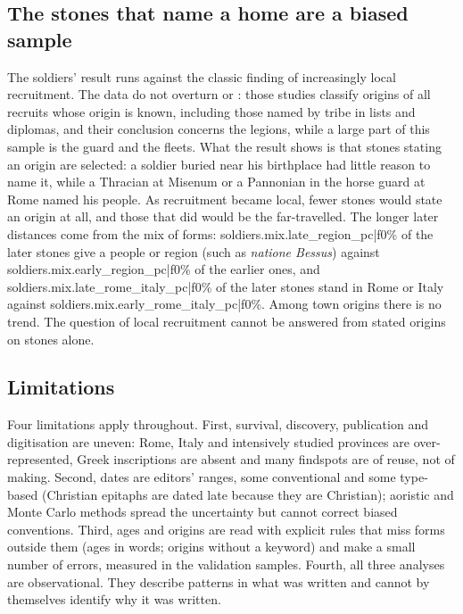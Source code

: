 \subsection{The stones that name a home are a biased sample}
The soldiers' result runs against the classic finding of increasingly local recruitment. The data do not overturn \citet{forni1953} or \citet{mann1983}: those studies classify origins of all recruits whose origin is known, including those named by tribe in lists and diplomas, and their conclusion concerns the legions, while a large part of this sample is the guard and the fleets. What the result shows is that stones stating an origin are selected: a soldier buried near his birthplace had little reason to name it, while a Thracian at Misenum or a Pannonian in the horse guard at Rome named his people. As recruitment became local, fewer stones would state an origin at all, and those that did would be the far-travelled. The longer later distances come from the mix of forms: {{soldiers.mix.late_region_pc|f0}}\% of the later stones give a people or region (such as \textit{natione Bessus}) against {{soldiers.mix.early_region_pc|f0}}\% of the earlier ones, and {{soldiers.mix.late_rome_italy_pc|f0}}\% of the later stones stand in Rome or Italy against {{soldiers.mix.early_rome_italy_pc|f0}}\%. Among town origins there is no trend. The question of local recruitment cannot be answered from stated origins on stones alone.

\subsection{Limitations}
Four limitations apply throughout. First, survival, discovery, publication and digitisation are uneven: Rome, Italy and intensively studied provinces are over-represented, Greek inscriptions are absent and many findspots are of reuse, not of making. Second, dates are editors' ranges, some conventional and some type-based (Christian epitaphs are dated late because they are Christian); aoristic and Monte Carlo methods spread the uncertainty but cannot correct biased conventions. Third, ages and origins are read with explicit rules that miss forms outside them (ages in words; origins without a keyword) and make a small number of errors, measured in the validation samples. Fourth, all three analyses are observational. They describe patterns in what was written and cannot by themselves identify why it was written.

